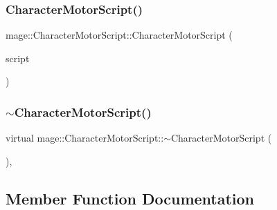 \hypertarget{classmage_1_1_character_motor_script_a944682d8ff570a141e60cdd2d16aa3ad}{}\label{classmage_1_1_character_motor_script_a944682d8ff570a141e60cdd2d16aa3ad} 
\subsubsection{\texorpdfstring{Character\+Motor\+Script()}{CharacterMotorScript()}\hspace{0.1cm}{\footnotesize\ttfamily [3/3]}}
{\footnotesize\ttfamily mage\+::\+Character\+Motor\+Script\+::\+Character\+Motor\+Script (\begin{DoxyParamCaption}\item[{\hyperlink{classmage_1_1_character_motor_script}{Character\+Motor\+Script} \&\&}]{script }\end{DoxyParamCaption})\hspace{0.3cm}{\ttfamily [default]}}

\hypertarget{classmage_1_1_character_motor_script_a03e8cdb2e30e21fe3a84f36101a169e3}{}\label{classmage_1_1_character_motor_script_a03e8cdb2e30e21fe3a84f36101a169e3} 
\subsubsection{\texorpdfstring{$\sim$\+Character\+Motor\+Script()}{~CharacterMotorScript()}}
{\footnotesize\ttfamily virtual mage\+::\+Character\+Motor\+Script\+::$\sim$\+Character\+Motor\+Script (\begin{DoxyParamCaption}{ }\end{DoxyParamCaption})\hspace{0.3cm}{\ttfamily [virtual]}, {\ttfamily [default]}}



\subsection{Member Function Documentation}
\hypertarget{classmage_1_1_character_motor_script_a0c512015222e3f332429df414c06862b}{}\label{classmage_1_1_character_motor_script_a0c512015222e3f332429df414c06862b} 
